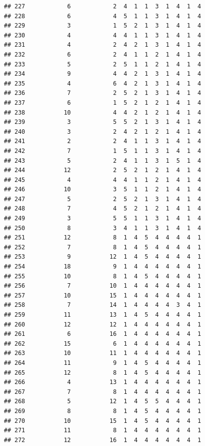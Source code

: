 \documentclass[12pt,]{krantz}
\theoremstyle{definition}
\theoremstyle{definition}
\theoremstyle{remark}
\begin{document}
\begin{verbatim}
## 227            6            2  4  1  1  3  1  4  1  4
## 228            6            4  5  1  1  3  1  4  1  4
## 229            3            1  5  2  1  3  1  4  1  4
## 230            4            4  4  1  1  3  1  4  1  4
## 231            4            2  4  2  1  3  1  4  1  4
## 232            6            2  4  1  1  2  1  4  1  4
## 233            5            2  5  1  1  2  1  4  1  4
## 234            9            4  4  2  1  3  1  4  1  4
## 235            4            6  4  2  1  3  1  4  1  4
## 236            7            2  5  2  1  3  1  4  1  4
## 237            6            1  5  2  1  2  1  4  1  4
## 238           10            4  4  2  1  2  1  4  1  4
## 239            3            5  5  2  1  3  1  4  1  4
## 240            3            2  4  2  1  2  1  4  1  4
## 241            2            2  4  1  1  3  1  4  1  4
## 242            7            1  5  1  1  3  1  4  1  4
## 243            5            2  4  1  1  3  1  5  1  4
## 244           12            2  5  2  1  2  1  4  1  4
## 245            4            4  4  1  1  2  1  4  1  4
## 246           10            3  5  1  1  2  1  4  1  4
## 247            5            2  5  2  1  3  1  4  1  4
## 248            7            4  5  2  1  2  1  4  1  4
## 249            3            5  5  1  1  3  1  4  1  4
## 250            8            3  4  1  1  3  1  4  1  4
## 251           12            8  1  4  5  4  4  4  4  1
## 252            7            8  1  4  5  4  4  4  4  1
## 253            9           12  1  4  5  4  4  4  4  1
## 254           18            9  1  4  4  4  4  4  4  1
## 255           10            8  1  4  5  4  4  4  4  1
## 256            7           10  1  4  4  4  4  4  4  1
## 257           10           15  1  4  4  4  4  4  4  1
## 258            7           14  1  4  4  4  4  3  4  1
## 259           11           13  1  4  5  4  4  4  4  1
## 260           12           12  1  4  4  4  4  4  4  1
## 261            6           16  1  4  4  4  4  4  4  1
## 262           15            6  1  4  4  4  4  4  4  1
## 263           10           11  1  4  4  4  4  4  4  1
## 264           11            9  1  4  5  4  4  4  4  1
## 265           12            8  1  4  5  4  4  4  4  1
## 266            4           13  1  4  4  4  4  4  4  1
## 267            7            8  1  4  4  4  4  4  4  1
## 268            5           12  1  4  5  5  4  4  4  1
## 269            8            8  1  4  5  4  4  4  4  1
## 270           10           15  1  4  5  4  4  4  4  1
## 271           11            8  1  4  4  4  4  4  4  1
## 272           12           16  1  4  4  4  4  4  4  1

\end{verbatim}
\end{document}
